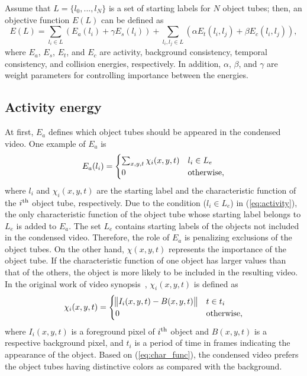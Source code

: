 \documentclass[11pt]{hyu_thesis}
\begin{document}
Assume that $L=\{l_0,...,l_N\}$ is a set of starting labels for $N$ object tubes; then, an objective function $E(L)$ can be defined as
\begin{equation}
\label{eq:basic_form}
E(L)=\sum_{l_i \in L} ( E_a(l_i) + \gamma E_s(l_i) ) + \sum_{l_i,l_j \in L} ( \alpha E_t(l_i, l_j) + \beta E_c(l_i, l_j) ),
\end{equation}
where $E_a$, $E_s$, $E_t$, and $E_c$ are activity, background consistency, temporal consistency, and collision energies, respectively. In addition, $\alpha$, $\beta$, and $\gamma$ are weight parameters for controlling importance between the energies.

\subsection{Activity energy}
At first, $E_a$ defines which object tubes should be appeared in the condensed video. One example of $E_a$ is
\begin{equation}
\label{eq:activity}
E_a(l_i) =
\begin{cases}
\sum_{x,y,t} \chi_i (x,y,t) & l_i \in L_e \\
0 & \rm{otherwise},
\end{cases}
\end{equation}
where $l_i$ and $\chi_i (x,y,t)$ are the starting label and the characteristic function of the $i^{\rm{th}}$ object tube, respectively. Due to the condition ($l_i \in L_e$) in (\ref{eq:activity}), the only characteristic function of the object tube whose starting label belongs to $L_e$ is added to $E_a$. The set $L_e$ contains starting labels of the objects not included in the condensed video. Therefore, the role of $E_a$ is penalizing exclusions of the object tubes. On the other hand, $\chi (x,y,t)$ represents the importance of the object tube. If the characteristic function of one object has larger values than that of the others, the object is more likely to be included in the resulting video. In the original work of video synopsis~\cite{Rav-Acha2006,Pritch2007,Pritch2008}, $\chi_i (x,y,t)$ is defined as
\begin{equation}
\label{eq:char_func}
\chi_i(x,y,t)=
\begin{cases}
\norm{I_i(x,y,t)-B(x,y,t)} & t \in t_i\\
0 & \rm{otherwise},
\end{cases}
\end{equation}
where $I_i(x,y,t)$ is a foreground pixel of $i^{\rm{th}}$ object and $B(x,y,t)$ is a respective background pixel, and $t_i$ is a period of time in frames indicating the appearance of the object. Based on (\ref{eq:char_func}), the condensed video prefers the object tubes having distinctive colors as compared with the background. 
\end{document}
